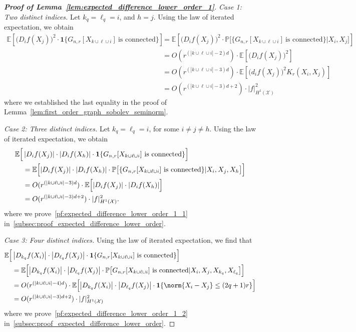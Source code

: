 \documentclass{article}
\newcommand{\abs}[1]{\left \lvert #1 \right \rvert}
\newcommand{\1}{\mathbf{1}}
\newcommand{\Xset}{\mathcal{X}}
\newcommand{\Pbb}{\mathbb{P}}
\newcommand{\Ebb}{\mathbb{E}}
\theoremstyle{alden}
\theoremstyle{aldenthm}
\theoremstyle{definition}
\theoremstyle{remark}
\begin{document}
\begin{proof}[\textbf{Proof of Lemma~\ref{lem:expected_difference_lower_order_1}}]
	\textit{Case 1: Two distinct indices.}
	Let $k_q = \ell_q = i$, and $h = j$. Using the law of iterated expectation, we obtain
	\begin{align*}
	\Ebb \left[\bigl(D_{i}f(X_j)\bigr)^2 \cdot \1\{G_{n,r}[X_{k \cup \ell \cup i}] ~\textrm{is connected} \}\right] &= \Ebb \left[\bigl(D_{i}f(X_j)\bigr)^2 \cdot \Pbb\bigl[\{G_{n,r}[X_{k \cup \ell \cup i}] ~\textrm{is connected} \} |X_i,X_j\bigr]\right] \\
	& = O(r^{(\abs{k \cup \ell \cup i} - 2)d}) \cdot \Ebb\left[\bigl(D_{i}f(X_j)\bigr)^2\right] \\
	& = O(r^{(\abs{k \cup \ell \cup i} - 3)d}) \cdot \Ebb\left[\bigl(d_{i}f(X_j)\bigr)^2K_r(X_i,X_j)\right] \\
	& = O(r^{(\abs{k \cup \ell \cup i} - 3)d + 2}) \cdot |f|_{H^1(\Xset)}^2
	\end{align*}
	where we established the last equality in the proof of Lemma~\ref{lem:first_order_graph_sobolev_seminorm}.
	
	\textit{Case 2: Three distinct indices.}
	Let $k_q = \ell_q = i$, for some $i \neq j \neq h$. Using the law of iterated expectation, we obtain
	\begin{align}
	\Ebb \Bigl[ & \abs{D_{i}f(X_j)} \cdot \abs{D_if(X_h)} \cdot \1\{G_{n,r}[X_{k \cup \ell \cup i}] ~\textrm{is connected} \}\Bigr] \nonumber \\
	& = \Ebb\Bigl[\abs{D_{i}f(X_j)} \cdot \abs{D_if(X_h)} \cdot \Pbb\bigl[\{G_{n,r}[X_{k \cup \ell \cup i}] ~\textrm{is connected} \} |X_i,X_j,X_h\bigr]\Bigr] \nonumber \\
	& = O(r^{(\abs{k \cup \ell \cup i} - 3)d}) \cdot \Ebb\Bigl[\abs{D_{i}f(X_j)} \cdot \abs{D_if(X_h)} \Bigr]\nonumber \\
	& = O(r^{(\abs{k \cup \ell \cup i} - 3)d + 2})\cdot|f|_{H^1(\Xset)}^2. \label{pf:expected_difference_lower_order_1_1}
	\end{align}
	where we prove~\eqref{pf:expected_difference_lower_order_1_1} in~\ref{subsec:proof_expected_difference_lower_order}.
	
	\textit{Case 3: Four distinct indices.}
	Using the law of iterated expectation, we find that
	\begin{align}
	\Ebb\Bigl[ &\abs{D_{k_q}f(X_i)}\cdot{\abs{D_{\ell_q}f(X_j)}} \cdot \1\{G_{n,r}[X_{k \cup \ell \cup i}] ~\textrm{is connected} \}\Bigr] \nonumber \\
	& = \Ebb\Bigl[\abs{D_{k_q}f(X_i)}\cdot{\abs{D_{\ell_q}f(X_j)}} \cdot\Pbb\bigl[G_{n,r}[X_{k \cup \ell \cup i}] ~\textrm{is connected}|X_i,X_j,X_{k_q},X_{\ell_q}\bigr]\Bigr] \nonumber \\
	& = O(r^{(\abs{k \cup \ell \cup i} - 4)d}) \cdot \Ebb\Bigl[\abs{D_{k_q}f(X_i)}\cdot{\abs{D_{\ell_q}f(X_j)}}\cdot\1\{\norm{X_i - X_j} \leq (2q + 1)r\}\Bigr] \nonumber \\
	& = O(r^{(\abs{k \cup \ell \cup i} - 3)d + 2}) \cdot |f|_{H^1(\Xset)}^2 \label{pf:expected_difference_lower_order_1_2}
	\end{align}
	where we prove~\eqref{pf:expected_difference_lower_order_1_2} in~\ref{subsec:proof_expected_difference_lower_order}.
\end{proof}
\end{document}
